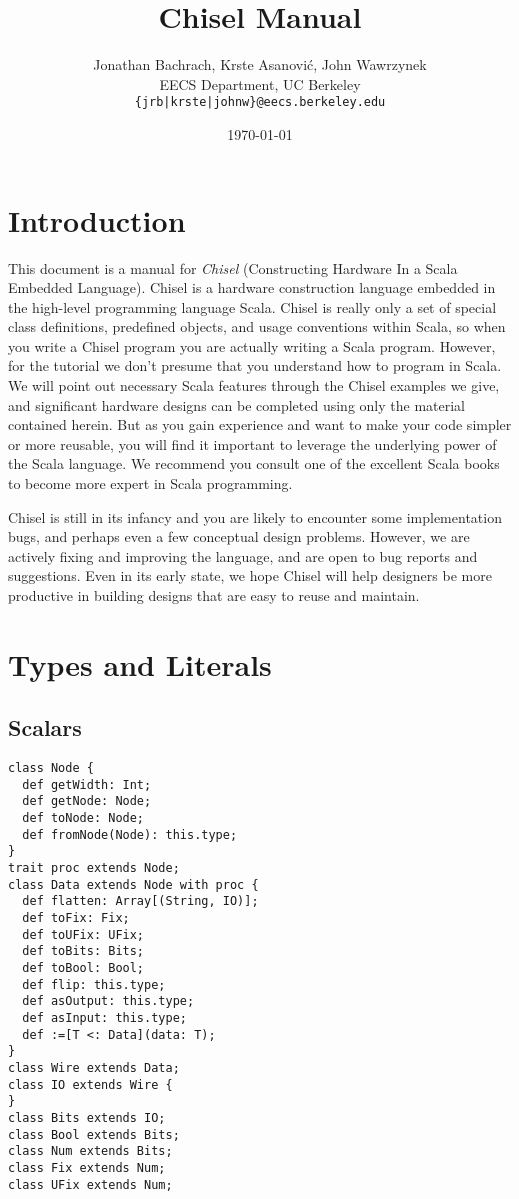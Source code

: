 \documentclass[10pt,twocolumn]{article}
\title{Chisel Manual}
\author{Jonathan Bachrach, Krste Asanovi\'{c}, John Wawrzynek \\
EECS Department, UC Berkeley\\
{\tt  \{jrb|krste|johnw\}@eecs.berkeley.edu}
}
\date{\today}
\begin{document}
\maketitle{}


\section{Introduction}

This document is a manual for {\em Chisel} (Constructing
Hardware In a Scala Embedded Language).  Chisel is a hardware
construction language embedded in the high-level programming language
Scala.  Chisel is really only a set of special class
definitions, predefined objects, and usage conventions within Scala,
so when you write a Chisel program you are actually writing a Scala
program.  However, for the tutorial we don't presume that you
understand how to program in Scala.  We will point out necessary Scala
features through the Chisel examples we give, and significant hardware
designs can be completed using only the material contained herein.
But as you gain experience and want to make your code simpler or more
reusable, you will find it important to leverage the underlying power
of the Scala language. We recommend you consult one of the excellent
Scala books to become more expert in Scala programming.

Chisel is still in its infancy and you are likely to encounter some
implementation bugs, and perhaps even a few conceptual design
problems.  However, we are actively fixing and improving the language,
and are open to bug reports and suggestions.  Even in its early state,
we hope Chisel will help designers be more productive in building
designs that are easy to reuse and maintain.

\section{Types and Literals}

\subsection{Scalars}

\begin{verbatim}
class Node {
  def getWidth: Int;
  def getNode: Node;
  def toNode: Node;
  def fromNode(Node): this.type;
}
trait proc extends Node;
class Data extends Node with proc {
  def flatten: Array[(String, IO)];
  def toFix: Fix;
  def toUFix: UFix;
  def toBits: Bits;
  def toBool: Bool;
  def flip: this.type;
  def asOutput: this.type;
  def asInput: this.type;
  def :=[T <: Data](data: T);
}
class Wire extends Data;
class IO extends Wire {
}
class Bits extends IO;
class Bool extends Bits;
class Num extends Bits;
class Fix extends Num; 
class UFix extends Num; 
\end{verbatim}
\end{document}
